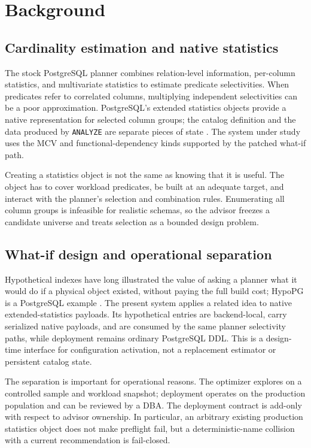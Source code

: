 \section{Background}

\subsection{Cardinality estimation and native statistics}

The stock PostgreSQL planner combines relation-level information, per-column
statistics, and multivariate statistics to estimate predicate selectivities.
When predicates refer to correlated columns, multiplying independent
selectivities can be a poor approximation. PostgreSQL's extended statistics
objects provide a native representation for selected column groups; the
catalog definition and the data produced by \texttt{ANALYZE} are separate
pieces of state \cite{PostgreSQL16Docs,PostgreSQL16Catalog}. The system under
study uses the MCV and functional-dependency kinds supported by the patched
what-if path.

Creating a statistics object is not the same as knowing that it is useful.
The object has to cover workload predicates, be built at an adequate target,
and interact with the planner's selection and combination rules. Enumerating
all column groups is infeasible for realistic schemas, so the advisor freezes a
candidate universe and treats selection as a bounded design problem.

\subsection{What-if design and operational separation}

Hypothetical indexes have long illustrated the value of asking a planner what
it would do if a physical object existed, without paying the full build cost;
HypoPG is a PostgreSQL example \cite{HypoPG}. The present system applies a
related idea to native extended-statistics payloads. Its hypothetical entries
are backend-local, carry serialized native payloads, and are consumed by the
same planner selectivity paths, while deployment remains ordinary PostgreSQL
DDL. This is a design-time interface for configuration activation, not a
replacement estimator or persistent catalog state.

The separation is important for operational reasons. The optimizer explores
on a controlled sample and workload snapshot; deployment operates on the
production population and can be reviewed by a DBA. The deployment contract
is add-only with respect to advisor ownership. In particular, an arbitrary
existing production statistics object does not make preflight fail, but a
deterministic-name collision with a current recommendation is fail-closed.

